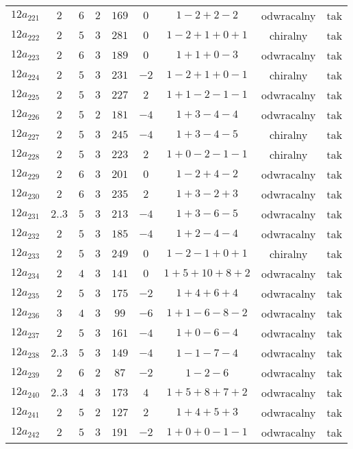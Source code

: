 \begin{longtable}{ccccccccc}
$12a_{221}$ & $2$ & $6$ & $2$ & $169$ & $0$ & $1-2+2-2$ & odwracalny & tak \\
$12a_{222}$ & $2$ & $5$ & $3$ & $281$ & $0$ & $1-2+1+0+1$ & chiralny & tak \\
$12a_{223}$ & $2$ & $6$ & $3$ & $189$ & $0$ & $1+1+0-3$ & odwracalny & tak \\
$12a_{224}$ & $2$ & $5$ & $3$ & $231$ & $-2$ & $1-2+1+0-1$ & chiralny & tak \\
$12a_{225}$ & $2$ & $5$ & $3$ & $227$ & $2$ & $1+1-2-1-1$ & odwracalny & tak \\
$12a_{226}$ & $2$ & $5$ & $2$ & $181$ & $-4$ & $1+3-4-4$ & odwracalny & tak \\
$12a_{227}$ & $2$ & $5$ & $3$ & $245$ & $-4$ & $1+3-4-5$ & chiralny & tak \\
$12a_{228}$ & $2$ & $5$ & $3$ & $223$ & $2$ & $1+0-2-1-1$ & chiralny & tak \\
$12a_{229}$ & $2$ & $6$ & $3$ & $201$ & $0$ & $1-2+4-2$ & odwracalny & tak \\
$12a_{230}$ & $2$ & $6$ & $3$ & $235$ & $2$ & $1+3-2+3$ & odwracalny & tak \\
$12a_{231}$ & $2..3$ & $5$ & $3$ & $213$ & $-4$ & $1+3-6-5$ & odwracalny & tak \\
$12a_{232}$ & $2$ & $5$ & $3$ & $185$ & $-4$ & $1+2-4-4$ & odwracalny & tak \\
$12a_{233}$ & $2$ & $5$ & $3$ & $249$ & $0$ & $1-2-1+0+1$ & chiralny & tak \\
$12a_{234}$ & $2$ & $4$ & $3$ & $141$ & $0$ & $1+5+10+8+2$ & odwracalny & tak \\
$12a_{235}$ & $2$ & $5$ & $3$ & $175$ & $-2$ & $1+4+6+4$ & odwracalny & tak \\
$12a_{236}$ & $3$ & $4$ & $3$ & $99$ & $-6$ & $1+1-6-8-2$ & odwracalny & tak \\
$12a_{237}$ & $2$ & $5$ & $3$ & $161$ & $-4$ & $1+0-6-4$ & odwracalny & tak \\
$12a_{238}$ & $2..3$ & $5$ & $3$ & $149$ & $-4$ & $1-1-7-4$ & odwracalny & tak \\
$12a_{239}$ & $2$ & $6$ & $2$ & $87$ & $-2$ & $1-2-6$ & odwracalny & tak \\
$12a_{240}$ & $2..3$ & $4$ & $3$ & $173$ & $4$ & $1+5+8+7+2$ & odwracalny & tak \\
$12a_{241}$ & $2$ & $5$ & $2$ & $127$ & $2$ & $1+4+5+3$ & odwracalny & tak \\
$12a_{242}$ & $2$ & $5$ & $3$ & $191$ & $-2$ & $1+0+0-1-1$ & odwracalny & tak \\

\end{longtable}
